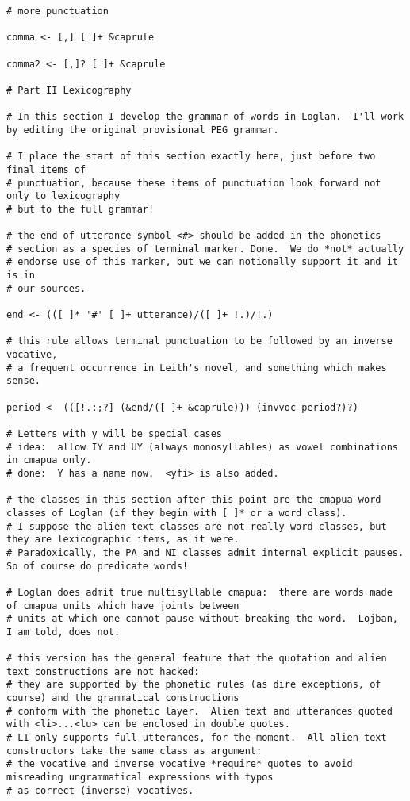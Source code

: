 \documentclass{article}
\begin{document}
\begin{verbatim}
# more punctuation

comma <- [,] [ ]+ &caprule

comma2 <- [,]? [ ]+ &caprule

# Part II Lexicography

# In this section I develop the grammar of words in Loglan.  I'll work by editing the original provisional PEG grammar.

# I place the start of this section exactly here, just before two final items of
# punctuation, because these items of punctuation look forward not only to lexicography
# but to the full grammar!

# the end of utterance symbol <#> should be added in the phonetics
# section as a species of terminal marker. Done.  We do *not* actually
# endorse use of this marker, but we can notionally support it and it is in 
# our sources.

end <- (([ ]* '#' [ ]+ utterance)/([ ]+ !.)/!.)

# this rule allows terminal punctuation to be followed by an inverse vocative,
# a frequent occurrence in Leith's novel, and something which makes sense.

period <- (([!.:;?] (&end/([ ]+ &caprule))) (invvoc period?)?)

# Letters with y will be special cases
# idea:  allow IY and UY (always monosyllables) as vowel combinations in cmapua only.
# done:  Y has a name now.  <yfi> is also added.

# the classes in this section after this point are the cmapua word classes of Loglan (if they begin with [ ]* or a word class).
# I suppose the alien text classes are not really word classes, but they are lexicographic items, as it were.
# Paradoxically, the PA and NI classes admit internal explicit pauses.  So of course do predicate words!

# Loglan does admit true multisyllable cmapua:  there are words made of cmapua units which have joints between
# units at which one cannot pause without breaking the word.  Lojban, I am told, does not.

# this version has the general feature that the quotation and alien text constructions are not hacked:
# they are supported by the phonetic rules (as dire exceptions, of course) and the grammatical constructions
# conform with the phonetic layer.  Alien text and utterances quoted with <li>...<lu> can be enclosed in double quotes.
# LI only supports full utterances, for the moment.  All alien text constructors take the same class as argument:
# the vocative and inverse vocative *require* quotes to avoid misreading ungrammatical expressions with typos
# as correct (inverse) vocatives.


\end{verbatim}
\end{document}
